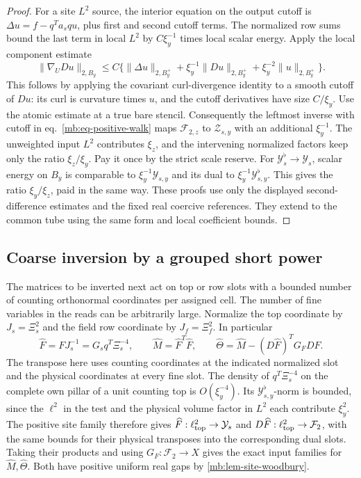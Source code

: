 \documentclass[11pt,letterpaper,reqno]{amsart}
\numberwithin{equation}{section}
\renewcommand{\eqref}[1]{\textup{eq.~\ref{#1}}}
\theoremstyle{definition}
\theoremstyle{remark}
\begin{document}
\begin{proof}
For a site \(L^2\) source, the interior equation on the output cutoff is \(\Delta u=f-q^Ta_squ\), plus first and second cutoff terms. The normalized row sums bound the last term in local \(L^2\) by \(C\xi_y^{-1}\) times local scalar energy. Apply the local component estimate
\[
 \|\nabla_U Du\|_{2,B_y}
   \le C\{\|\Delta u\|_{2,B_y^+}
       +\xi_y^{-1}\|Du\|_{2,B_y^+}
       +\xi_y^{-2}\|u\|_{2,B_y^+}\}.
\]
This follows by applying the covariant curl-divergence identity to a smooth cutoff of \(Du\): its curl is curvature times \(u\), and the cutoff derivatives have size \(C/\xi_y\). Use the atomic estimate at a true bare stencil. Consequently the leftmost inverse with cutoff in \eqref{mb:eq-positive-walk} maps \(\mathcal F_{2,z}\) to \(\mathcal Z_{s,y}\) with an additional \(\xi_y^{-1}\). The unweighted input \(L^2\) contributes \(\xi_z\), and the intervening normalized factors keep only the ratio \(\xi_z/\xi_y\). Pay it once by the strict scale reserve. For \(\mathcal Y_s^\flat\to \mathcal Y_s\), scalar energy on \(B_y\) is comparable to \(\xi_y^{-1}\mathcal Y_{s,y}\) and its dual to \(\xi_y^{-1}\mathcal Y_{s,y}^\flat\). This gives the ratio \(\xi_y/\xi_z\), paid in the same way. These proofs use only the displayed second-difference estimates and the fixed real coercive references. They extend to the common tube using the same form and local coefficient bounds.
\end{proof}

\subsection{Coarse inversion by a grouped short power}

The matrices to be inverted next act on top or row slots with a bounded number of counting orthonormal coordinates per assigned cell. The number of fine variables in the reads can be arbitrarily large. Normalize the top coordinate by \(J_s=\Xi_s^2\) and the field row coordinate by \(J_f=\Xi_f^2\). In particular
\[
 \widehat F=FJ_s^{-1}=G_s q^T\Xi_s^{-4},\qquad
 \widehat M=\widehat F^T\widehat F,\qquad
 \widehat\Theta=\widehat M-(D\widehat F)^TG_FD\widehat F .
\]
The transpose here uses counting coordinates at the indicated normalized slot and the physical coordinates at every fine slot. The density of \(q^T\Xi_s^{-4}\) on the complete own pillar of a unit counting top is \(O(\xi_y^{-4})\). Its \(\mathcal Y_{s,y}^\flat\)-norm is bounded, since the \(\ell^2\) in the test and the physical volume factor in \(L^2\) each contribute \(\xi_y^2\). The positive site family therefore gives \(\widehat F:\ell^2_{\rm top}\to \mathcal Y_s\) and \(D\widehat F:\ell^2_{\rm top}\to\mathcal F_2\), with the same bounds for their physical transposes into the corresponding dual slots. Taking their products and using \(G_F:\mathcal F_2\to X\) gives the exact input families for \(\widehat M,\widehat\Theta\). Both have positive uniform real gaps by \cref{mb:lem-site-woodbury}.
\end{document}
